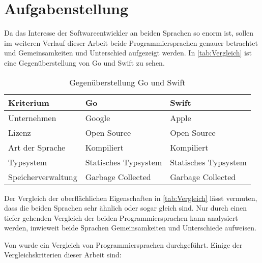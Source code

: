 \section{Aufgabenstellung}
Da das Interesse der Softwareentwickler an beiden Sprachen so enorm ist, sollen im weiteren Verlauf dieser Arbeit beide Programmiersprachen genauer betrachtet und Gemeinsamkeiten und Unterschied aufgezeigt werden.
In \autoref{tab:Vergleich} ist eine Gegenüberstellung von Go und Swift zu sehen.

\begin{table}[H]
    \centering
    \begin{tabularx}{\textwidth}{|X|X|X|}
    \hline 
    \rowcolor[gray]{0.75} \textbf{Kriterium} & \textbf{Go} & \textbf{Swift} \\
    \hline
	Unternehmen & Google & Apple \\
	\hline
	Lizenz & Open Source & Open Source \\
	\hline
	Art der Sprache & Kompiliert & Kompiliert \\
	\hline  
	Typsystem & Statisches Typsystem & Statisches Typsystem \\
	\hline
	Speicherverwaltung & Garbage Collected & Garbage Collected \\
    \hline
    \end{tabularx}
    \caption{Gegenüberstellung Go und Swift}
    \label{tab:Vergleich}
\end{table}


Der Vergleich der oberflächlichen Eigenschaften in \autoref{tab:Vergleich} lässt vermuten, dass die beiden Sprachen sehr ähnlich oder sogar gleich sind.
Nur durch einen tiefer gehenden Vergleich der beiden Programmiersprachen kann analysiert werden, inwieweit beide Sprachen Gemeinsamkeiten und Unterschiede aufweisen.

Von \cite{Comparsion} wurde ein Vergleich von Programmiersprachen durchgeführt.
Einige der Vergleichskriterien dieser Arbeit sind:

